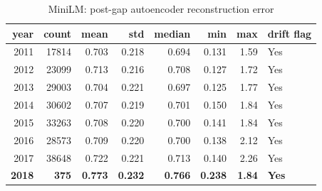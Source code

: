 \begin{table}[ht]
\centering
\caption{MiniLM: post-gap autoencoder reconstruction error}
\label{tab:minilm_ae_yearly}
\begin{tabular}{rrrrrrrl}
\toprule
year & count & mean & std & median & min & max & drift flag \\
\midrule
2011 & 17814 & 0.703 & 0.218 & 0.694 & 0.131 & 1.59 & Yes \\
2012 & 23099 & 0.713 & 0.216 & 0.708 & 0.127 & 1.72 & Yes \\
2013 & 29003 & 0.704 & 0.221 & 0.697 & 0.125 & 1.77 & Yes \\
2014 & 30602 & 0.707 & 0.219 & 0.701 & 0.150 & 1.84 & Yes \\
2015 & 33263 & 0.708 & 0.220 & 0.700 & 0.141 & 1.84 & Yes \\
2016 & 28573 & 0.709 & 0.220 & 0.700 & 0.138 & 2.12 & Yes \\
2017 & 38648 & 0.722 & 0.221 & 0.713 & 0.140 & 2.26 & Yes \\
\textbf{2018} & \textbf{375} & \textbf{0.773} & \textbf{0.232} & \textbf{0.766} & \textbf{0.238} & \textbf{1.84} & \textbf{Yes} \\
\bottomrule
\end{tabular}
\end{table}

